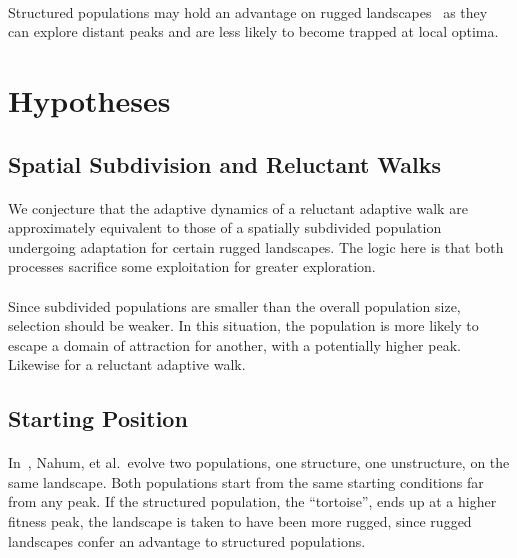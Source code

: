 \documentclass[12pt,letterpaper,titlepage]{article}
\begin{document}
\paragraph{}
Structured populations may hold an advantage on rugged
landscapes~\cite{Nahum2015} as they can explore distant peaks and are less
likely to become trapped at local optima.

\section{Hypotheses}

\subsection{Spatial Subdivision and Reluctant Walks}

\paragraph{}
We conjecture that the adaptive dynamics of a reluctant adaptive walk are
approximately equivalent to those of a spatially subdivided population
undergoing adaptation for certain rugged landscapes. The logic here is that
both processes sacrifice some exploitation for greater exploration.

\paragraph{}
Since subdivided populations are smaller than the overall population size,
selection should be weaker. In this situation, the population is more likely to
escape a domain of attraction for another, with a potentially higher peak.
Likewise for a reluctant adaptive walk.

\subsection{Starting Position}


\paragraph{}
In~\cite{Nahum2015}, Nahum, et al.\ evolve two populations, one structure, one
unstructure, on the same landscape. Both populations start from the same
starting conditions far from any peak. If the structured population, the
``tortoise'', ends up at a higher fitness peak, the landscape is taken to have
been more rugged, since rugged landscapes confer an advantage to structured
populations.
\end{document}

